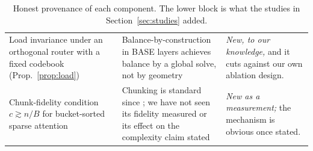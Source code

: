 \begin{table}[h]
\begin{tabular}{p{4.3cm}p{5.1cm}p{4.4cm}}
Load invariance under an orthogonal router with a fixed codebook (Prop.~\ref{prop:load}) & Balance-by-construction in BASE layers \citep{lewis2021base} achieves balance by a global solve, not by geometry & \emph{New, to our knowledge,} and it cuts against our own ablation design. \\
Chunk-fidelity condition $c \gtrsim n/B$ for bucket-sorted sparse attention & Chunking is standard since \citet{kitaev2020reformer}; we have not seen its fidelity measured or its effect on the complexity claim stated & \emph{New as a measurement;} the mechanism is obvious once stated. \\
\bottomrule
\end{tabular}
\caption{Honest provenance of each component. The lower block is what the studies in Section~\ref{sec:studies} added.}
\end{table}

